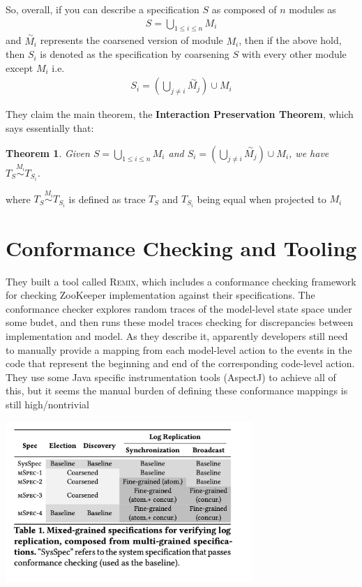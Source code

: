\documentclass[11pt, oneside]{article}   	%
\begin{document}
So, overall, if you can describe a specification $S$ as composed of $n$ modules as
\begin{align*}
    S = \bigcup_{1 \leq i \leq n} M_i
\end{align*}
and $\overset{\sim}{M_i}$ represents the coarsened version of module $M_i$, then if the above hold, then $S_i$ is denoted as the specification by coarsening $S$ with every other module except $M_i$ i.e.
\begin{align*}
    S_i = \left(\bigcup_{j \neq i} \overset{\sim}{M_j}\right) \cup M_i
\end{align*}

\newtheorem{theorem}{Theorem}

They claim the main theorem, the \textbf{Interaction Preservation Theorem}, which says essentially that: 
\begin{theorem}
    Given $S = \bigcup_{1 \leq i \leq n} M_i$ and  $S_i = \left(\bigcup_{j \neq i} \overset{\sim}{M_j}\right) \cup M_i$, we have $T_S \overset{M_i}{\sim} T_{S_i}$.
\end{theorem}
where $T_S \overset{M_i}{\sim} T_{S_i}$ is defined as trace $T_S$ and $T_{S_i}$ being equal when projected to $M_i$ 

\section*{Conformance Checking and Tooling}

They built a tool called \textsc{Remix}, which includes a conformance checking framework for checking ZooKeeper implementation against their specifications. The conformance checker explores random traces of the model-level state space under some budet, and then runs these model traces checking for discrepancies between implementation and model. As they describe it, apparently developers still need to manually provide a mapping from each model-level action to the events in the code that represent the beginning and end of the corresponding code-level action. They use some Java specific instrumentation tools (AspectJ) to achieve all of this, but it seems the manual burden of defining these conformance mappings is still high/nontrivial

\begin{center}
    \includegraphics[width=0.7\textwidth]{grained-specs.png}
\end{center}
\end{document}
